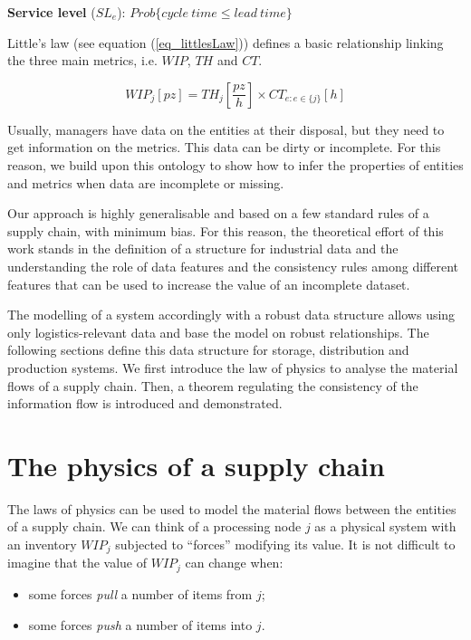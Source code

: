 \textbf{Service level} ($SL_e$): $Prob\{cycle\ time\le lead\ time\}$

Little’s law (see equation (\ref{eq_littlesLaw})) defines a basic relationship linking the three main metrics, i.e. $WIP$, $TH$ and $CT$.

\begin{equation}
WIP_j [pz]=TH_j \left[\frac{pz}{h}\right] \times CT_{e:e \in \{j\} } [h]
\label{eq_littlesLaw}
\end{equation}

Usually, managers have data on the entities at their disposal, but they need to get information on the metrics. This data can be dirty or incomplete. For this reason, we build upon this ontology to show how to infer the properties of entities and metrics when data are incomplete or missing.\par

Our approach is highly generalisable and based on a few standard rules of a supply chain, with minimum bias. For this reason, the theoretical effort of this work stands in the definition of a structure for industrial data and the understanding the role of data features and the consistency rules among different features that can be used to increase the value of an incomplete dataset.\par

The modelling of a system accordingly with a robust data structure allows using only logistics-relevant data and base the model on robust relationships. The following sections define this data structure for storage, distribution and production systems. We first introduce the law of physics to analyse the material flows of a supply chain. Then, a theorem regulating the consistency of the information flow is introduced and demonstrated.\par


\section{The physics of a supply chain} \label{sect_supplyChainPhysics}

The laws of physics can be used to model the material flows between the entities of a supply chain. We can think of a processing node $j$ as a physical system with an inventory $WIP_j$ subjected to “forces” modifying its value. It is not difficult to imagine that the value of $WIP_j$ can change when:
\begin{itemize}
    \item some forces \textit{pull} a number of items from $j$;
    \item 	some forces \textit{push} a number of items into $j$.
\end{itemize}

